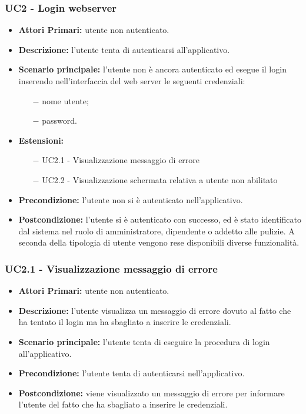 \subsubsection{ UC2 - Login webserver}
\begin{itemize}
           	\item\textbf{Attori Primari:} utente non autenticato.
           	\item\textbf{Descrizione:} l’utente tenta di autenticarsi all'applicativo.
           	\item\textbf{Scenario principale:} l’utente non è ancora autenticato ed esegue il login inserendo nell'interfaccia del web server le seguenti credenziali:
           	\begin{itemize}
           		\item[$-$] nome utente;
           		\item[$-$] password.
           	\end{itemize}
           	\item\textbf{Estensioni:}
           	\begin{itemize}
           		\item[$-$] UC2.1 - Visualizzazione messaggio di errore
           		\item[$-$] UC2.2 - Visualizzazione schermata relativa a utente non abilitato
           	\end{itemize}
           	\item\textbf{Precondizione:} l’utente non si è autenticato nell'applicativo. 
           	\item\textbf{Postcondizione:} l’utente si è autenticato con successo, ed è stato identificato dal sistema nel ruolo di amministratore, dipendente o addetto alle pulizie. A seconda della tipologia di utente vengono rese
           	disponibili diverse funzionalità.
\end{itemize}

\subsubsection{ UC2.1 - Visualizzazione messaggio di errore}
\begin{itemize}
	\item\textbf{Attori Primari:} utente non autenticato.
	\item\textbf{Descrizione:} l'utente visualizza un messaggio di errore dovuto al fatto che ha tentato il login ma ha sbagliato a inserire le credenziali.
	\item\textbf{Scenario principale:} l’utente tenta di eseguire la procedura di login all'applicativo.
	\item\textbf{Precondizione:} l'utente tenta di autenticarsi nell'applicativo.
	\item\textbf{Postcondizione:} viene visualizzato un messaggio di errore per informare l'utente del fatto che ha sbagliato a inserire le credenziali.
\end{itemize}
